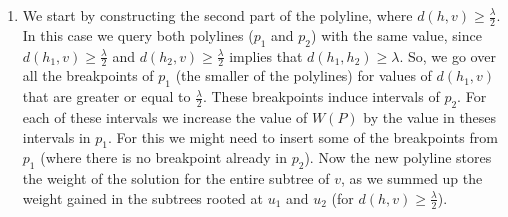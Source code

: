 \documentclass[11pt,a4paper]{article}
\theoremstyle{definition}
\theoremstyle{remark}
\begin{document}
\begin{enumerate}
\item We start by constructing the second part of the polyline, where $d(h,v) \geq \frac{\lambda}{2}$. In this case we query both polylines ($p_1$ and $p_2$) with the same value, since $d(h_1,v) \geq \frac{\lambda}{2}$ and $d(h_2,v) \geq \frac{\lambda}{2}$ implies that $d(h_1,h_2) \geq \lambda$. So, we go over all the breakpoints of $p_1$ (the smaller of the polylines) for values of $d(h_1,v)$ that are greater or equal to $\frac{\lambda}{2}$. These breakpoints induce intervals of $p_2$. For each of these intervals we increase the value of $W(P)$ by the value in theses intervals in $p_1$. For this we might need to insert some of the breakpoints from $p_1$ (where there is no breakpoint already in $p_2$). Now the new polyline stores the weight of the solution for the entire subtree of $v$, as we summed up the weight gained in the subtrees rooted at $u_1$ and $u_2$ (for $d(h,v) \geq \frac{\lambda}{2}$). 


\end{enumerate}
\end{document}
